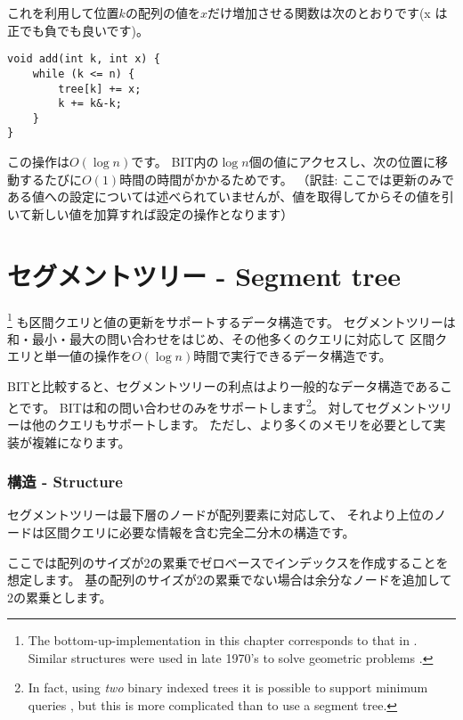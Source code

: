 これを利用して位置$k$の配列の値を$x$だけ増加させる関数は次のとおりです(x は正でも負でも良いです)。
\begin{lstlisting}
void add(int k, int x) {
    while (k <= n) {
        tree[k] += x;
        k += k&-k;
    }
}
\end{lstlisting}

この操作は$O(\log n)$です。
BIT内の$\log n$個の値にアクセスし、次の位置に移動するたびに$O(1)$時間の時間がかかるためです。
（訳註: ここでは更新のみである値への設定については述べられていませんが、値を取得してからその値を引いて新しい値を加算すれば設定の操作となります）

\section{セグメントツリー - Segment tree}


\footnote{The bottom-up-implementation in this chapter corresponds to
that in \cite{sta06}. Similar structures were used
in late 1970's to solve geometric problems \cite{ben80}.}
も区間クエリと値の更新をサポートするデータ構造です。
セグメントツリーは和・最小・最大の問い合わせをはじめ、その他多くのクエリに対応して
区間クエリと単一値の操作を$O(\log n)$時間で実行できるデータ構造です。

BITと比較すると、セグメントツリーの利点はより一般的なデータ構造であることです。
BITは和の問い合わせのみをサポートします\footnote{In fact, using \emph{two} binary
indexed trees it is possible to support minimum queries \cite{dim15},
but this is more complicated than to use a segment tree.}。
対してセグメントツリーは他のクエリもサポートします。
ただし、より多くのメモリを必要として実装が複雑になります。

\subsubsection{構造 - Structure}

セグメントツリーは最下層のノードが配列要素に対応して、
それより上位のノードは区間クエリに必要な情報を含む完全二分木の構造です。

ここでは配列のサイズが2の累乗でゼロベースでインデックスを作成することを想定します。
基の配列のサイズが2の累乗でない場合は余分なノードを追加して2の累乗とします。

